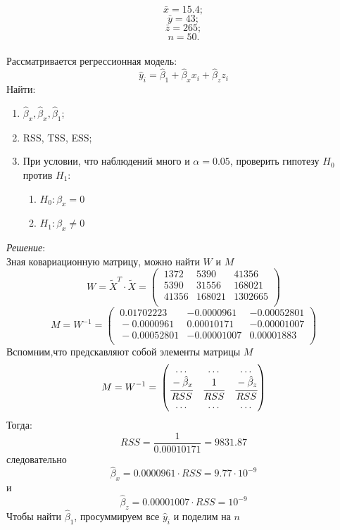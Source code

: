 \documentclass[12pt]{article} %
\theoremstyle{definition} %
\def \hb{\hat{\beta}}
\begin{document}
\[\bar{x} = 15.4;\]
\[\bar{y} = 43;\]
\[\bar{z} = 265;\]
\[n = 50.\]\\
Рассматривается регрессионная модель:\\
\[\hat{y}_i=\hat{\beta}_1+\hat{\beta}_xx_i+\hat{\beta}_zz_i\]
Найти:\\
\begin{enumerate}
    \item $\hat{\beta}_x, \hat{\beta}_x, \hat{\beta}_1$;
    \item RSS, TSS, ESS;
    \item При условии, что наблюдений много и $\alpha = 0.05$, проверить гипотезу $H_0$ против $H_1$:
    \begin{enumerate}
        \item $H_0: \beta_x = 0$
        \item $H_1: \beta_x \neq 0$
    \end{enumerate}
\end{enumerate}
\textit{Решение}:\\
Зная ковариационную матрицу, можно найти $W$ и $M$
\[W = \widetilde{X}^T\cdot\widetilde{X} = \begin{pmatrix}
            \ 1372 & 5390 & 41356\\
            \ 5390 & 31556 & 168021 \\
            \ 41356 & 168021 & 1302665\\
        \end{pmatrix}
\]
\[M = W^{-1} = \begin{pmatrix}
            \ 0.01702223 & -0.0000961 & -0.00052801\\
            \ -0.0000961 &  0.00010171 & -0.00001007 \\
            \ -0.00052801 & -0.00001007 &  0.00001883\\
        \end{pmatrix}
\]
Вспомним,что предскавляют собой элементы матрицы $M$
 \[
 M = W^{-1} = \\
    \begin{pmatrix}
         \ldots & \ldots & \ldots \\
        \cfrac{-\hb_x}{RSS} & \cfrac{1}{RSS} & \cfrac{-\hb_z}{RSS}  \\
        \ldots & \ldots & \ldots \\
     \end{pmatrix}
 \]
Тогда:
\[RSS = \dfrac{1}{0.00010171} =  9831.87\]
следовательно
\[\hb_x = 0.0000961\cdot RSS = 9.77\cdot10^{-9}\]
и
\[\hb_z = 0.00001007\cdot RSS = 10^{-9}\]
Чтобы найти $\hat{\beta}_1$, просуммируем все $\hat{y}_i$ и поделим на $n$
\end{document}
